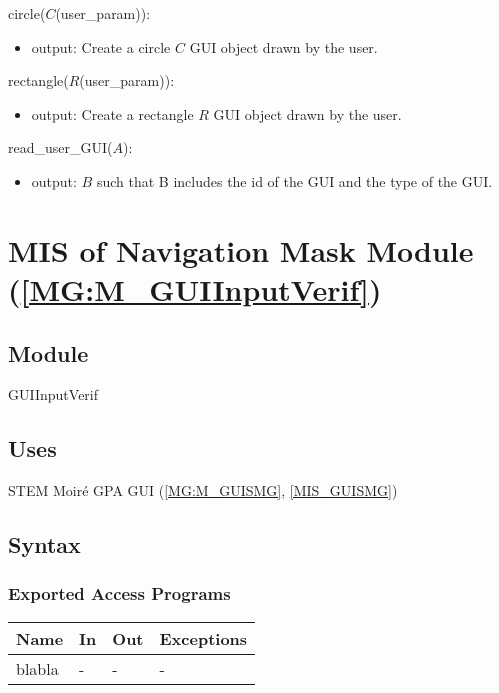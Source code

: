 \documentclass[12pt, titlepage]{article}
\begin{document}
\noindent circle($C$(user{\_}param)):
\begin{itemize}
\item output: Create a circle $C$ GUI object drawn by the user.
\end{itemize}

\noindent rectangle($R$(user{\_}param)):
\begin{itemize}
\item output: Create a rectangle $R$ GUI object drawn by the user. 
\end{itemize}

\noindent read{\_}user{\_}GUI($A$):
\begin{itemize}
\item output:  $B$ such that B includes the id of the GUI and the type of the 
GUI.
\end{itemize}
\bigskip

\iffalse
\section{MIS of Navigation Mask Module (\texorpdfstring{\cref{MG:M_GUIInputVerif}}))} \label{MIS_GUIInputVerif}


\subsection{Module}
GUIInputVerif
\subsection{Uses}
\item STEM Moir{\'e} GPA GUI (\cref{MG:M_GUISMG}, \cref{MIS_GUISMG})
\subsection{Syntax}

\subsubsection{Exported Access Programs}

\begin{center}
\begin{tabular}{p{3cm} p{4cm} p{4cm} p{3cm}}
\hline
\textbf{Name} & \textbf{In} & \textbf{Out} & \textbf{Exceptions} \\
\hline
blabla & - & - & - \\
\hline
\end{tabular}
\end{center}
\end{document}
